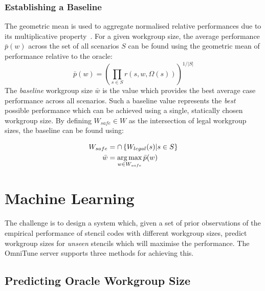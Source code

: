 \subsubsection{Establishing a Baseline}

The geometric mean is used to aggregate normalised relative
performances due to its multiplicative
property~\cite{Fleming1986}. For a given workgroup size, the average
performance $\bar{p}(w)$ across the set of all scenarios $S$ can be
found using the geometric mean of performance relative to the oracle:
%
\begin{equation}
\bar{p}(w) =
\left(
  \prod_{s \in S} r(s, w, \Omega(s))
\right)^{1/|S|}
\end{equation}
%
The \emph{baseline} workgroup size $\bar{w}$ is the value which
provides the best average case performance across all scenarios. Such
a baseline value represents the \emph{best} possible performance which
can be achieved using a single, statically chosen workgroup size. By
defining $W_{safe} \in W$ as the intersection of legal workgroup
sizes, the baseline can be found using:

\begin{align}
W_{safe} &= \cap \left\{ W_{legal}(s) | s \in S \right\}\\
\bar{w} &= \operatorname*{arg\,max}_{w \in W_{safe}} \bar{p}(w)
\end{align}


\section{Machine Learning}\label{sec:omnitune-ml}

The challenge is to design a system which, given a set of prior
observations of the empirical performance of stencil codes with
different workgroup sizes, predict workgroup sizes for \emph{unseen}
stencils which will maximise the performance. The OmniTune server
supports three methods for achieving this.


\subsection{Predicting Oracle Workgroup Size}\label{subsec:omnitune-ml-class}

